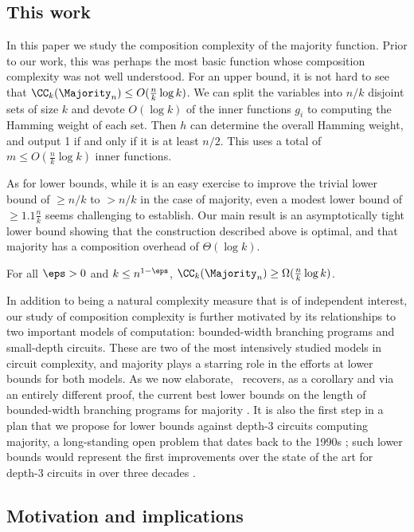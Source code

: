 \subsection{This work}
In this paper we study the composition complexity of the majority function.
Prior to our work, this was perhaps the most basic function whose composition complexity was not well understood.
For an upper bound, it is not hard to see that $\CC_k(\Majority_n) \leq O(\frac{n}{k} \log k)$.
We can split the variables into $n/k$ disjoint sets of size $k$ and devote $O(\log k)$ of the inner functions $g_i$ to computing the Hamming weight of each set.
Then $h$ can determine the overall Hamming weight, and output 1 if and only if it is at least $n/2$.
This uses a total of $m \leq O(\frac{n}{k} \log k)$ inner functions.

As for lower bounds, while it is an easy exercise to improve the trivial lower bound of $\ge n/k$
to $> n/k$
in the case of majority,
even a modest lower bound of $\ge 1.1 \frac{n}{k}$ seems challenging to establish.
Our main result is an asymptotically tight lower bound showing that the construction described above is optimal, and that majority has a composition overhead of $\Theta(\log k)$.

\begin{theorem}\label{thm:main}
For all $\eps > 0$ and $k \leq n^{1 - \eps}$, $\CC_k(\Majority_n) \geq \Omega(\frac{n}{k} \log k)$.
\end{theorem}


In addition to being a natural complexity measure that is of independent interest, our study of composition complexity is further motivated by its relationships to two important models of computation: bounded-width branching programs and small-depth circuits.
These are two of the most intensively studied models in circuit complexity, and majority plays a starring role in the efforts at lower bounds for both models.
As we now elaborate,~ recovers, as a corollary and via an entirely different proof, the current best lower bounds on the length of bounded-width branching programs for majority \cite{AM86,BPRS90}.
It is also the first step in a plan that we propose for lower bounds against depth-$3$ circuits computing majority, a long-standing open problem that dates back to the 1990s \cite{HJP93}; such lower bounds would represent the first improvements over the state of the art for depth-$3$ circuits in over three decades \cite{Has86}.

\subsection{Motivation and implications}\label{sec:motives}

